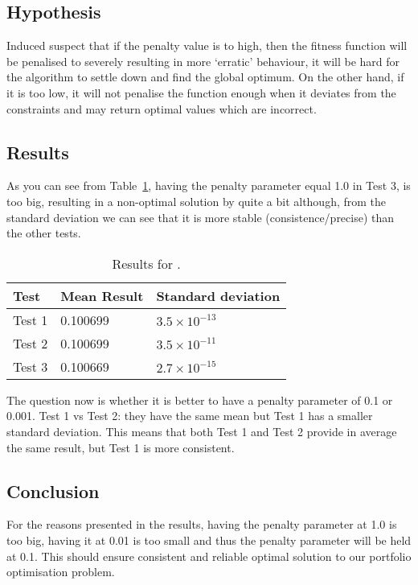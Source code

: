     \subsection{Hypothesis}
    Induced suspect that if the penalty value is to high, then the fitness function will be penalised to severely resulting in more `erratic' behaviour, it will be hard for the algorithm to settle down and find the global optimum. On the other hand, if it is too low, it will not penalise the function enough when it deviates from the constraints and may return optimal values which are incorrect. 

    \subsection{Results}
    As you can see from Table~\ref{table:penalty_results}, having the penalty parameter equal 1.0 in Test 3, is too big, resulting in a non-optimal solution by quite a bit although, from the standard deviation we can see that it is more stable (consistence/precise) than the other tests.
        \begin{table}[H]
          \setlength{\extrarowheight}{2.0pt}
          \begin{tabular}{|l|l|l|}
            \hline
            Test & Mean Result & Standard deviation \\
            \hline
            Test 1 & 0.100699 & $3.5\times10^{-13}$ \\
            \hline
            Test 2 & 0.100699 & $3.5\times10^{-11}$ \\
            \hline
            Test 3 & 0.100669 & $2.7\times10^{-15}$ \\
            \hline
          \end{tabular}
          \caption{Results for .}
          \label{table:penalty_results}
        \end{table}

      The question now is whether it is better to have a penalty parameter of 0.1 or 0.001. Test 1 vs Test 2: they have the same mean but Test 1 has a smaller standard deviation. This means that both Test 1 and Test 2 provide in average the same result, but Test 1 is more consistent.

    \subsection{Conclusion}
      For the reasons presented in the results, having the penalty parameter at 1.0 is too big, having it at 0.01 is too small and thus the penalty parameter will be held at 0.1. This should ensure consistent and reliable optimal solution to our portfolio optimisation problem.

